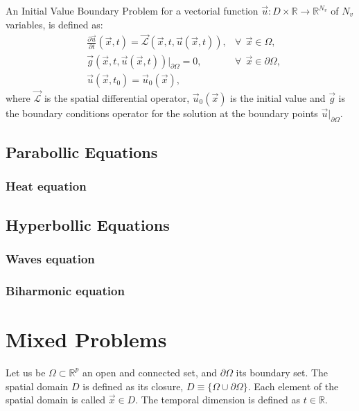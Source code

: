        An Initial Value Boundary Problem for a vectorial function $\vec{u}: D \times \mathbb{R}\rightarrow \mathbb{R}^{N_v}$ of $N_v$ variables, is defined as:
       \begin{eqnarray}
         &\frac{\partial \vec{u} }{\partial t}(\vec{x},t) =\vec{\mathcal{L}} (\vec{x},t,\vec{u}(\vec{x},t)) , & \forall \ \ \vec{x} \in  \Omega, \\
         &\vec{g} (\vec{x},t,\vec{u}(\vec{x},t))\big\rvert_{\partial \Omega}=0 ,  & \forall \ \ \vec{x} \in \partial \Omega,\\
         & \vec{u}(\vec{x},t_0)=\vec{u}_0(\vec{x}), 
       \end{eqnarray}
       where $\vec{\mathcal{L}}$ is the spatial dif{}ferential operator, $\vec{u}_0(\vec{x})$ is the initial value and $\vec{g}$ is the boundary conditions operator for the solution at the boundary points $\vec{u} \big\rvert_{\partial \Omega}$.
       
       

       \subsection{Parabollic Equations}
       \subsubsection{Heat equation}
       
       \subsection{Hyperbollic Equations}
       \subsubsection{Waves equation}
       \subsubsection{Biharmonic equation}

       \newpage
       \section{Mixed Problems}
       Let us be $\Omega \subset \mathbb{ R}^p$ an open and connected set, and $\partial \Omega$ its boundary set. The spatial domain $D$ is defined as its closure, $D \equiv \{\Omega \cup \partial \Omega\}$. Each element of the spatial domain is called  $\vec{x} \in D $. The temporal dimension is defined as $t \in \mathbb{R} $. 
       
